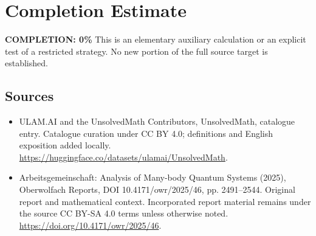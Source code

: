 \documentclass[11pt]{article}
\begin{document}
\section{Completion Estimate}
\noindent\textbf{COMPLETION: 0\%}
This is an elementary auxiliary calculation or an explicit test of a restricted strategy. No new portion of the full source target is established.

\subsection{Sources}
\begin{itemize}
\item[\hypertarget{source:statement:1}{S1}] ULAM.AI and the UnsolvedMath Contributors, UnsolvedMath, catalogue entry. Catalogue curation under CC BY 4.0; definitions and English exposition added locally.
\url{https://huggingface.co/datasets/ulamai/UnsolvedMath}.
\item[\hypertarget{source:statement:2}{S2}] Arbeitsgemeinschaft: Analysis of Many-body Quantum Systems (2025), Oberwolfach Reports, DOI 10.4171/owr/2025/46, pp. 2491--2544. Original report and mathematical context. Incorporated report material remains under the source CC BY-SA 4.0 terms unless otherwise noted.
\url{https://doi.org/10.4171/owr/2025/46}.
\end{itemize}
\label{end:statement}
\end{document}

